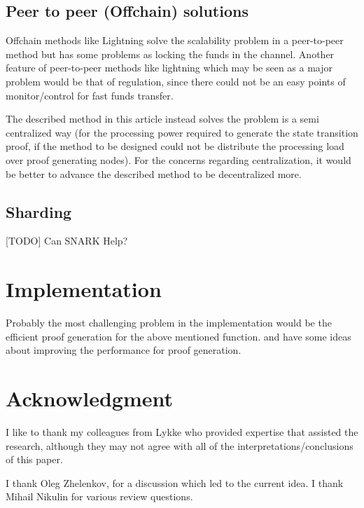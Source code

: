 \documentclass{article}
\begin{document}
\subsection{Peer to peer (Offchain) solutions}

Offchain methods like Lightning solve the scalability problem in a peer-to-peer method but has some problems as locking the funds in the channel. Another feature of peer-to-peer methods like lightning which may be seen as a major problem would be that of regulation, since there could not be an easy points of monitor/control for fast funds transfer.

The described method in this article instead solves the problem is a semi centralized way (for the processing power required to generate the state transition proof, if the method to be designed could not be distribute the processing load over proof generating nodes). For the concerns regarding centralization, it would be better to advance the described method to be decentralized more.

\subsection{Sharding}
[TODO]
Can SNARK Help?\cite{sharding}

\section{Implementation}

Probably the most challenging problem in the implementation would be the efficient proof generation for the above mentioned function. \cite{zkCluster} and \cite{scalableZKSNARK} have some ideas about improving the performance for proof generation.

\section{Acknowledgment}

I like to thank my colleagues from Lykke who provided expertise that assisted the research, although they may not agree with all of the interpretations/conclusions of this paper.

I thank Oleg Zhelenkov, for a discussion which led to the current idea. I thank Mihail Nikulin for various review questions.
\end{document}
